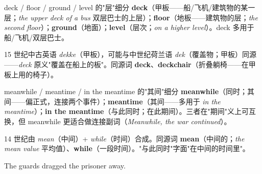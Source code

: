 \documentclass[../main.tex]{subfiles}
\begin{document}


\begin{gram}{deck / floor / ground / level 的"层"细分}
\textbf{deck}（甲板——船/飞机/建筑物的某一层；\textit{the upper deck of a bus} 双层巴士的上层）；\textbf{floor}（地板——建筑物的层；\textit{the second floor}）；\textbf{ground}（地面）；\textbf{level}（层次；\textit{on a higher level}）。deck 多用于船/飞机/双层巴士。
\end{gram}

\begin{origin}
15 世纪中古英语 \textit{dekke}（甲板），可能与中世纪荷兰语 \textit{dek}（覆盖物；甲板）同源——\textit{deck} 原义"覆盖在船上的板"。同源词 \textbf{deck}、\textbf{deckchair}（折叠躺椅——在甲板上用的椅子）。
\end{origin}





\begin{gram}{meanwhile / meantime / in the meantime 的"其间"细分}
\textbf{meanwhile}（同时；其间——偏正式，连接两个事件）；\textbf{meantime}（其间——多用于 \textit{in the meantime}）；\textbf{in the meantime}（与此同时；在此期间）。三者在"期间"义上可互换，但 meanwhile 更适合做连接副词（\textit{Meanwhile, the war continued}）。
\end{gram}

\begin{origin}
14 世纪由 \textit{mean}（中间）+ \textit{while}（时间）合成。同源词 \textbf{mean}（中间的；\textit{the mean value} 平均值）、\textbf{while}（一段时间）。"与此同时"字面"在中间的时间里"。
\end{origin}


{The guards dragged the prisoner away.}
\end{document}

